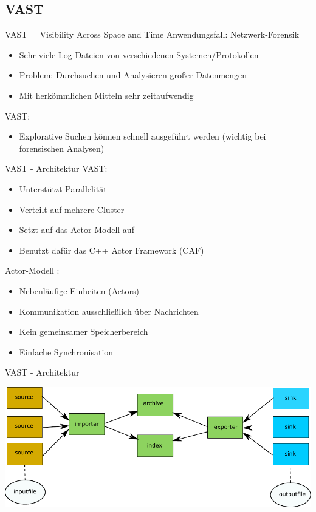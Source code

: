 \documentclass[9pt]{beamer}
\begin{document}
\subsection{VAST}

\begin{frame}{VAST = Visibility Across Space and Time}{}
	Anwendungsfall: Netzwerk-Forensik
	\begin{itemize}
		\item Sehr viele Log-Dateien von verschiedenen Systemen/Protokollen
		\item Problem: Durchsuchen und Analysieren großer Datenmengen
		\item Mit herkömmlichen Mitteln sehr zeitaufwendig
	\end{itemize}
	VAST:
	\begin{itemize}
		\item Explorative Suchen können schnell ausgeführt werden (wichtig bei forensischen Analysen)
	\end{itemize}
\end{frame}

\begin{frame}{VAST - Architektur}{}
	VAST:
	\begin{itemize}
		\item Unterstützt Parallelität
		\item Verteilt auf mehrere Cluster
		\item Setzt auf das Actor-Modell auf
		\item Benutzt dafür das C++ Actor Framework (CAF)
	\end{itemize}	
	Actor-Modell :
	\begin{itemize}
		\item Nebenläufige Einheiten (Actors)
		\item Kommunikation ausschließlich über Nachrichten
		\item Kein gemeinsamer Speicherbereich
		\item Einfache Synchronisation
	\end{itemize}
\end{frame}
\begin{frame}{VAST - Architektur}{}
	\begin{center}
		\includegraphics[width=1.0\textwidth]{res/vast.pdf}
	\end{center}
\end{frame}
\end{document}

